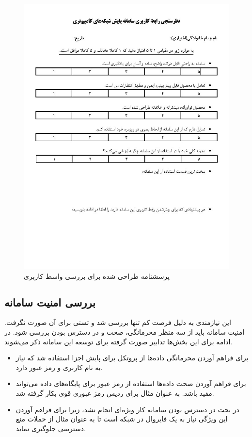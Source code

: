 \begin{figure}[!h]
    \centering\includegraphics[scale=.90]{./survey}
    \caption{پرسشنامه طراحی شده برای بررسی واسط کاربری}\label{fig.57}
\end{figure}

\cleardoublepage

\subsection{بررسی امنیت سامانه }

این نیازمندی به دلیل فرصت کم تنها بررسی شد و تستی برای آن صورت نگرفت. امنیت سامانه باید از سه منظر محرمانگی، صحت و در دسترس بودن بررسی شود. در ادامه برای این بخش‌ها تدابیر صورت گرفته برای توسعه این سامانه ذکر می‌شوند.

\begin{itemize}
    \item برای فراهم آوردن محرمانگی داده‌ها از پروتکل  برای پایش اجزا استفاده شد که نیاز به نام کاربری و رمز عبور دارد.
    \item برای فراهم آوردن صحت داده‌ها استفاده از رمز عبور برای پایگاه‌های داده می‌تواند مفید باشد. به عنوان مثال برای ردیس رمز عبوری قوی بکار گرفته شد.
    \item در بحث در دسترس بودن سامانه کار ویژه‌ای انجام نشد، زیرا برای فراهم آوردن این ویژگی نیاز به یک فایروال در شبکه است تا به عنوان مثال از حملات منع دسترسی جلوگیری نماید. 
\end{itemize}